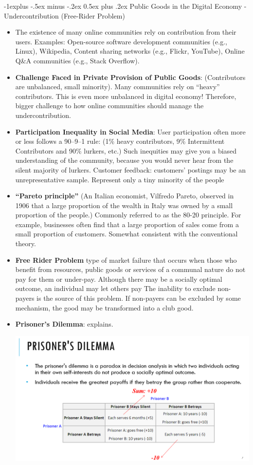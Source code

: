 \documentclass[12pt, landscape]{article}
\makeatletter
\renewcommand{\subsection}{\@startsection{subsection}{2}{0mm}%
                                {-1explus -.5ex minus -.2ex}%
                                {0.5ex plus .2ex}%
                                {\normalfont\normalsize\bfseries}}
\makeatother
\begin{document}
\begin{multicols*}{3}
\subsection{Public Goods in the Digital Economy - Undercontribution (Free-Rider Problem)}
\begin{itemize}
\item The existence of many online communities rely on contribution from their users. Examples: Open-source software development communities (e.g., Linux), Wikipedia, Content sharing networks (e.g., Flickr, YouTube), Online Q\&A communities (e.g., Stack Overflow).
\item \textbf{Challenge Faced in Private Provision of Public Goods}: (Contributors are unbalanced, small minority). Many communities rely on “heavy” contributors. This is even more unbalanced in digital economy! Therefore, bigger challenge to how online communities should manage the undercontribution. 
\item \textbf{Participation Inequality in Social Media}: User participation often more or less follows a 90–9–1 rule: (1\% heavy contributors, 9\% Intermittent Contributors and 90\% lurkers, etc.) Such inequities may give you a biased understanding of the community, because you would never hear from the silent majority of lurkers. Customer feedback: customers’ postings may be an unrepresentative sample. Represent only a tiny minority of the people
\item \textbf{“Pareto principle”} (An Italian economist, Vilfredo Pareto, observed in 1906 that a large proportion of the wealth in Italy was owned by a small proportion of the people.) Commonly referred to as the 80-20 principle. For example, businesses often find that a large proportion of sales come from a small proportion of customers. Somewhat consistent with the conventional theory.
\item \textbf{Free Rider Problem} type of market failure that occurs when those who benefit from resources, public goods or services of a communal nature do not pay for them or under-pay. Although there may be a socially optimal outcome, an individual may let others pay
The inability to exclude non-payers is the source of this problem. If non-payers can be excluded by some mechanism, the good may be transformed into a club good.
\item \textbf{Prisoner's Dilemma}: explains. 
\centerline{\includegraphics[width = 0.7\linewidth]{prisonerDilemma}}
\end{itemize}

\end{multicols*}
\end{document}
